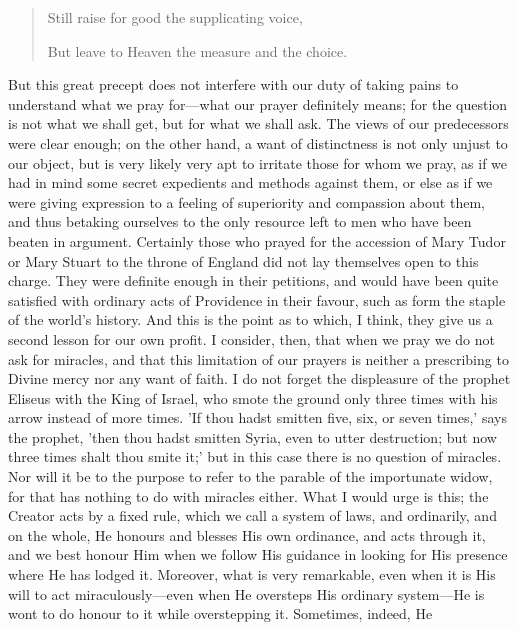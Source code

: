 \begin{quote}

Still raise for good the supplicating voice,

But leave to Heaven the measure and the choice.

\end{quote}

But this great precept does not interfere with our duty of taking
pains to understand what we pray for—what our prayer definitely
means; for the question is not what we shall get, but for what we
shall ask. The views of our predecessors were clear enough; on the
other hand, a want of distinctness is not only unjust to our object,
but is very likely very apt to irritate those for whom we pray, as if
we had in mind some secret expedients and methods against them, or
else as if we were giving expression to a feeling of superiority and
compassion about them, and thus betaking ourselves to the only
resource left to men who have been beaten in argument. Certainly
those who prayed for the accession of Mary Tudor or Mary Stuart to the
throne of England did not lay themselves open to this charge. They
were definite enough in their petitions, and would have been quite
satisfied with ordinary acts of Providence in their favour, such as
form the staple of the world’s history. And this is the point as to
which, I think, they give us a second lesson for our own profit. I
consider, then, that when we pray we do not ask for miracles, and that
this limitation of our prayers is neither a prescribing to Divine
mercy nor any want of faith. I do not forget the displeasure of the
prophet Eliseus with the King of Israel, who smote the ground only
three times with his arrow instead of more times. 'If thou hadst
smitten five, six, or seven times,' says the prophet, 'then thou hadst
smitten Syria, even to utter destruction; but now three times shalt
thou smite it;' but in this case there is no question of miracles. Nor
will it be to the purpose to refer to the parable of the importunate
widow, for that has nothing to do with miracles either. What I would
urge is this; the Creator acts by a fixed rule, which we call a system
of laws, and ordinarily, and on the whole, He honours and blesses His
own ordinance, and acts through it, and we best honour Him when we
follow His guidance in looking for His presence where He has lodged
it. Moreover, what is very remarkable, even when it is His will to act
miraculously—even when He oversteps His ordinary system—He is wont
to do honour to it while overstepping it. Sometimes, indeed, He
